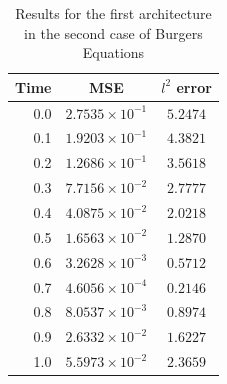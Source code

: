 \documentclass[12pt,letterpaper]{article}
\begin{document}
\begin{table}[H]
  \begin{center}
  \begin{tabular}{ r | c  c }
  \textbf{Time} & \textbf{MSE} & \textbf{$l^2$ error} \\ \hline
  0.0 & $ 2.7535\times 10^{-1}$ & $ 5.2474 $ \\
  0.1 & $ 1.9203\times 10^{-1}$ & $ 4.3821 $ \\
  0.2 & $ 1.2686\times 10^{-1}$ & $ 3.5618 $ \\
  0.3 & $ 7.7156\times 10^{-2}$ & $ 2.7777 $ \\
  0.4 & $ 4.0875\times 10^{-2}$ & $ 2.0218 $ \\
  0.5 & $ 1.6563\times 10^{-2}$ & $ 1.2870 $ \\
  0.6 & $ 3.2628\times 10^{-3}$ & $ 0.5712 $ \\
  0.7 & $ 4.6056\times 10^{-4}$ & $ 0.2146 $ \\
  0.8 & $ 8.0537\times 10^{-3}$ & $ 0.8974 $ \\
  0.9 & $ 2.6332\times 10^{-2}$ & $ 1.6227 $ \\
  1.0 & $ 5.5973\times 10^{-2}$ & $ 2.3659 $ \\
  \end{tabular}
  \caption{Results for the first architecture in the second case of Burgers Equations}
  \label{tab:B21}
  \end{center}
  \end{table}
\end{document}
